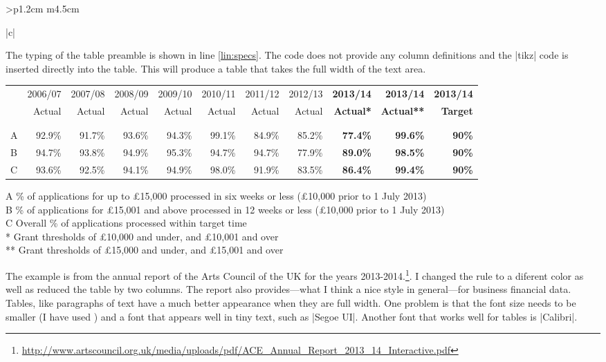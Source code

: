 \begin{tabular}{>{\bfseries}p{1.2cm} m{4.5cm}}
\begin{tabular}[t]{|c|}
\begin{longtable}
The typing of the table preamble is shown in line \ref{lin:specs}. The code does not provide any column definitions and the |tikz| code is inserted directly into the table. This will produce a table that takes the full width of the
text area. 
\bigskip
\parindent 0pt


\newfontfamily{}
{\UI\footnotesize
\begin{tabular}[\textwidth]{@{}l r r r r r r r>{\bfseries\color{black!80}}r >{\bfseries\color{black!80}}r >{\bfseries\color{black!80}}r@{}} 
& 2006/07 &2007/08 &2008/09 &2009/10 &2010/11 &2011/12 &2012/13 &2013/14 &2013/14 &2013/14\\
& Actual &Actual &Actual &Actual &Actual &Actual &Actual &Actual* &Actual** &Target\\
\begin{tikzpicture}[remember picture, overlay]
\path [midrule] (0,0) -- (\the\linewidth,0) node {};
\end{tikzpicture}\\ \\[-1pt]
A   &92.9\% &91.7\% &93.6\% &94.3\% &99.1\% &84.9\% &85.2\% &77.4\% &99.6\% &90\%\\

B  &94.7\% &93.8\% &94.9\% &95.3\% &94.7\% &94.7\% &77.9\% &89.0\% &98.5\% &90\%\\

C  &93.6\% &92.5\% &94.1\% &94.9\% &98.0\% &91.9\% &83.5\% &86.4\% &99.4\% &90\%\\
\end{tabular}
\medskip

A \% of applications for up to £15,000 processed in six weeks or less (£10,000 prior to 1 July 2013)\\
B \% of applications for £15,001 and above processed in 12 weeks or less (£10,000 prior to 1 July 2013)\\
C Overall \% of applications processed within target time\\
* Grant thresholds of £10,000 and under, and £10,001 and over\\
** Grant thresholds of £15,000 and under, and £15,001 and over\\

} %

The example is from the annual report of the Arts Council of the UK for the years 2013-2014.\footnote{\protect\url{http://www.artscouncil.org.uk/media/uploads/pdf/ACE_Annual_Report_2013_14_Interactive.pdf}}. I changed the rule to a diferent color as well as reduced the table by two columns.  The report also provides---what I think a nice style in general---for business financial data. Tables, like paragraphs of text have a much better appearance
when they are full width. One problem is that the font size needs to be smaller (I have used \cmd{\footnotesize}) and a font that appears well in tiny text, such as |Segoe UI|. Another font that works well for tables is |Calibri|.



\end{longtable}
\end{tabular}
\end{tabular}
